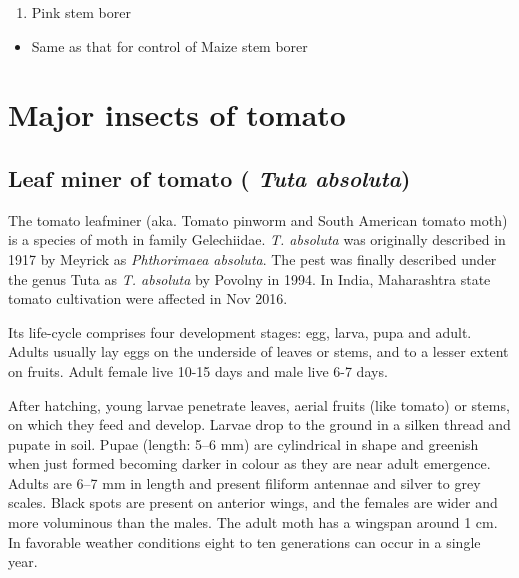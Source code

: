 \documentclass[
  openany]{book}
\providecommand{\tightlist}{%
  \setlength{\itemsep}{0pt}\setlength{\parskip}{0pt}}
\begin{document}
\begin{enumerate}
\def\labelenumi{\arabic{enumi}.}
\setcounter{enumi}{2}
\tightlist
\item
  Pink stem borer
\end{enumerate}

\begin{itemize}
\tightlist
\item
  Same as that for control of Maize stem borer
\end{itemize}

\hypertarget{major-insects-of-tomato}{%
\section{Major insects of tomato}\label{major-insects-of-tomato}}

\hypertarget{leaf-miner-of-tomato-tuta-absoluta}{%
\subsection{\texorpdfstring{Leaf miner of tomato ( \emph{Tuta absoluta})}{Leaf miner of tomato ( Tuta absoluta)}}\label{leaf-miner-of-tomato-tuta-absoluta}}

The tomato leafminer (aka. Tomato pinworm and South American tomato moth) is a species of moth in family Gelechiidae. \emph{T. absoluta} was originally described in 1917 by Meyrick as \emph{Phthorimaea absoluta}. The pest was finally described under the genus Tuta as \emph{T. absoluta} by Povolny in 1994. In India, Maharashtra state tomato cultivation were affected in Nov 2016.

Its life-cycle comprises four development stages: egg, larva, pupa and adult. Adults usually lay eggs on the underside of leaves or stems, and to a lesser extent on fruits. Adult female live 10-15 days and male live 6-7 days.

After hatching, young larvae penetrate leaves, aerial fruits (like tomato) or stems, on which they feed and develop. Larvae drop to the ground in a silken thread and pupate in soil. Pupae (length: 5--6 mm) are cylindrical in shape and greenish when just formed becoming darker in colour as they are near adult emergence. Adults are 6--7 mm in length and present filiform antennae and silver to grey scales. Black spots are present on anterior wings, and the females are wider and more voluminous than the males. The adult moth has a wingspan around 1 cm. In favorable weather conditions eight to ten generations can occur in a single year.
\end{document}
